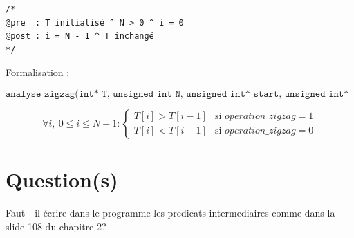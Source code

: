 \documentclass[a4paper, 11pt, oneside]{article}
\begin{document}
\begin{verbatim}
/*
@pre  : T initialisé ^ N > 0 ^ i = 0
@post : i = N - 1 ^ T inchangé
*/
\end{verbatim}

Formalisation :

\[
\texttt{analyse\_zigzag(int* T, unsigned int N, unsigned int* start, 
unsigned int* end, unsigned int* length, int* sum)}
\]

\[
\forall i, \ 0 \le i \le N-1 :
\begin{cases}
T[i] > T[i-1] & \text{si } operation\_zigzag = 1 \\
T[i] < T[i-1] & \text{si } operation\_zigzag = 0
\end{cases}
\]



\section{Question(s)}
Faut - il écrire dans le programme les predicats intermediaires comme dans la slide 108 du chapitre 2?
\end{document}
